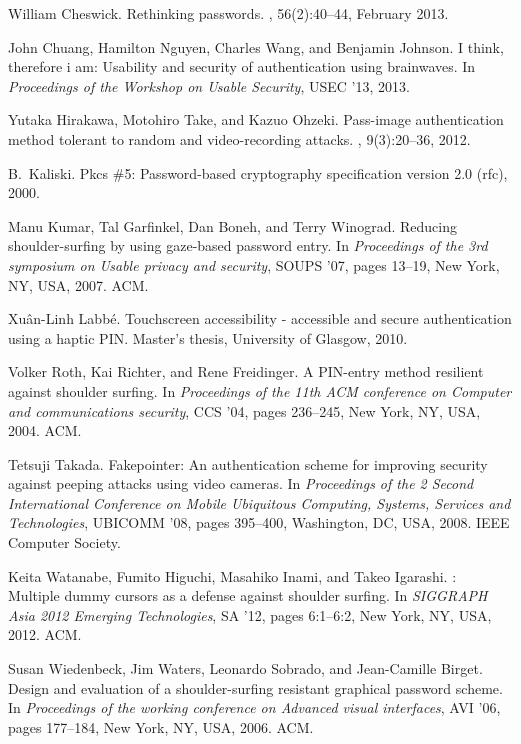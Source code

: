 \documentclass[12pt,onecolumn]{article}
\begin{document}
  
\begin{thebibliography}{10}

William Cheswick.
\newblock Rethinking passwords.
, 56(2):40--44, February 2013.

John Chuang, Hamilton Nguyen, Charles Wang, and Benjamin Johnson.
\newblock I think, therefore i am: {U}sability and security of authentication
  using brainwaves.
\newblock In {\em Proceedings of the Workshop on Usable Security}, USEC '13,
  2013.

Yutaka Hirakawa, Motohiro Take, and Kazuo Ohzeki.
\newblock Pass-image authentication method tolerant to random and
  video-recording attacks.
, 9(3):20--36, 2012.

B.~Kaliski.
\newblock Pkcs \#5: Password-based cryptography specification version 2.0
  (rfc), 2000.

Manu Kumar, Tal Garfinkel, Dan Boneh, and Terry Winograd.
\newblock Reducing shoulder-surfing by using gaze-based password entry.
\newblock In {\em Proceedings of the 3rd symposium on Usable privacy and
  security}, SOUPS '07, pages 13--19, New York, NY, USA, 2007. ACM.

Xu\^an-Linh Labb\'e.
\newblock Touchscreen accessibility - accessible and secure authentication
  using a haptic {PIN}.
\newblock Master's thesis, University of Glasgow, 2010.

Volker Roth, Kai Richter, and Rene Freidinger.
\newblock A {PIN}-entry method resilient against shoulder surfing.
\newblock In {\em Proceedings of the 11th ACM conference on Computer and
  communications security}, CCS '04, pages 236--245, New York, NY, USA, 2004.
  ACM.

Tetsuji Takada.
\newblock Fakepointer: {A}n authentication scheme for improving security
  against peeping attacks using video cameras.
\newblock In {\em Proceedings of the 2 Second International Conference on
  Mobile Ubiquitous Computing, Systems, Services and Technologies}, UBICOMM
  '08, pages 395--400, Washington, DC, USA, 2008. IEEE Computer Society.

Keita Watanabe, Fumito Higuchi, Masahiko Inami, and Takeo Igarashi.
: {M}ultiple dummy cursors as a defense against
  shoulder surfing.
\newblock In {\em SIGGRAPH Asia 2012 Emerging Technologies}, SA '12, pages
  6:1--6:2, New York, NY, USA, 2012. ACM.

Susan Wiedenbeck, Jim Waters, Leonardo Sobrado, and Jean-Camille Birget.
\newblock Design and evaluation of a shoulder-surfing resistant graphical
  password scheme.
\newblock In {\em Proceedings of the working conference on Advanced visual
  interfaces}, AVI '06, pages 177--184, New York, NY, USA, 2006. ACM.

\end{thebibliography}
\end{document}
